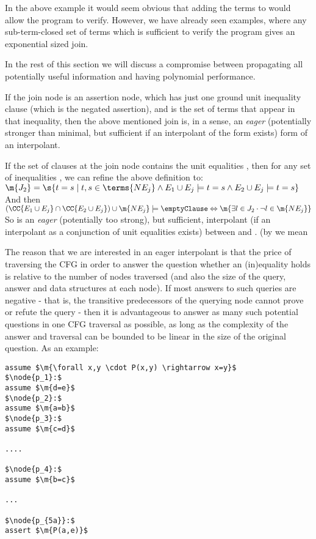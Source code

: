 In the above example it would seem obvious that adding the terms  to would allow the program to verify.
However, we have already seen examples, where any sub-term-closed set of terms which is sufficient to verify the program gives an exponential sized join.

In the rest of this section we will discuss a compromise between propagating all potentially useful information and having polynomial performance.

If the join node is an assertion node, which has just one ground unit inequality clause (which is the negated assertion), and 
 is the set of terms that appear in that inequality, then the above mentioned join is, in a sense, an \emph{eager} (potentially stronger than minimal, but sufficient if an interpolant of the form exists) form of an interpolant.

If the set of clauses  at the join node  contains the unit equalities , then for any set of inequalities , we can refine the above definition to:\\
$\m{J_2} = \s{t=s \mid t,s \in \terms{NE_j} \land E_1 \cup E_j \models t=s \land E_2 \cup E_j \models t=s }$\\
And then \\
$(\CC{E_1 \cup E_j} \cap \CC{E_2 \cup E_j}) \cup \m{NE_j} \models \emptyClause \Leftrightarrow \m{ \exists l \in J_2 \cdot \lnot l \in \m{NE_j}}$\\
So  is an \emph{eager} (potentially too strong), but sufficient, interpolant (if an interpolant as a conjunction of unit equalities exists) between  and .
(by  we mean 

The reason that we are interested in an eager interpolant is that the price of traversing the CFG in order to answer the question whether an (in)equality holds is relative to the number of nodes traversed (and also the size of the query, answer and data structures at each node). If most answers to such queries are negative - that is, the transitive predecessors of the querying node cannot prove or refute the query - then it is advantageous to answer as many such potential questions in one CFG traversal as possible, as long as the complexity of the answer and traversal can be bounded to be linear in the size of the original question.
As an example:
\begin{lstlisting}[caption=congruence closure eager interpolant,label=snippet3.28]
assume $\m{\forall x,y \cdot P(x,y) \rightarrow x=y}$
$\node{p_1}:$
assume $\m{d=e}$
$\node{p_2}:$
assume $\m{a=b}$
$\node{p_3}:$
assume $\m{c=d}$

....

$\node{p_4}:$
assume $\m{b=c}$

...

$\node{p_{5a}}:$
assert $\m{P(a,e)}$
\end{lstlisting}

